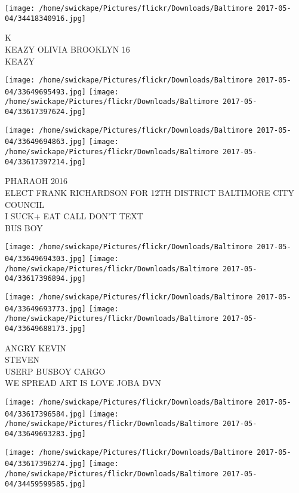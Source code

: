 \documentclass[10pt,letterpaper]{article}
\begin{document}
\vspace{0.25in}
\texttt{[image: /home/swickape/Pictures/flickr/Downloads/Baltimore 2017-05-04/34418340916.jpg]}

K\\
KEAZY OLIVIA BROOKLYN 16\\
KEAZY\\
\pagebreak

\texttt{[image: /home/swickape/Pictures/flickr/Downloads/Baltimore 2017-05-04/33649695493.jpg]}
\texttt{[image: /home/swickape/Pictures/flickr/Downloads/Baltimore 2017-05-04/33617397624.jpg]}

\texttt{[image: /home/swickape/Pictures/flickr/Downloads/Baltimore 2017-05-04/33649694863.jpg]}
\texttt{[image: /home/swickape/Pictures/flickr/Downloads/Baltimore 2017-05-04/33617397214.jpg]}

PHARAOH 2016\\
ELECT FRANK RICHARDSON FOR 12TH DISTRICT BALTIMORE CITY COUNCIL\\
I SUCK+ EAT CALL DON'T TEXT\\
BUS BOY\\
\pagebreak

\texttt{[image: /home/swickape/Pictures/flickr/Downloads/Baltimore 2017-05-04/33649694303.jpg]}
\texttt{[image: /home/swickape/Pictures/flickr/Downloads/Baltimore 2017-05-04/33617396894.jpg]}

\texttt{[image: /home/swickape/Pictures/flickr/Downloads/Baltimore 2017-05-04/33649693773.jpg]}
\texttt{[image: /home/swickape/Pictures/flickr/Downloads/Baltimore 2017-05-04/33649688173.jpg]}

ANGRY KEVIN\\
STEVEN\\
USERP BUSBOY CARGO\\
WE SPREAD ART IS LOVE JOBA DVN\\
\pagebreak

\texttt{[image: /home/swickape/Pictures/flickr/Downloads/Baltimore 2017-05-04/33617396584.jpg]}
\texttt{[image: /home/swickape/Pictures/flickr/Downloads/Baltimore 2017-05-04/33649693283.jpg]}

\texttt{[image: /home/swickape/Pictures/flickr/Downloads/Baltimore 2017-05-04/33617396274.jpg]}
\texttt{[image: /home/swickape/Pictures/flickr/Downloads/Baltimore 2017-05-04/34459599585.jpg]}
\end{document}
